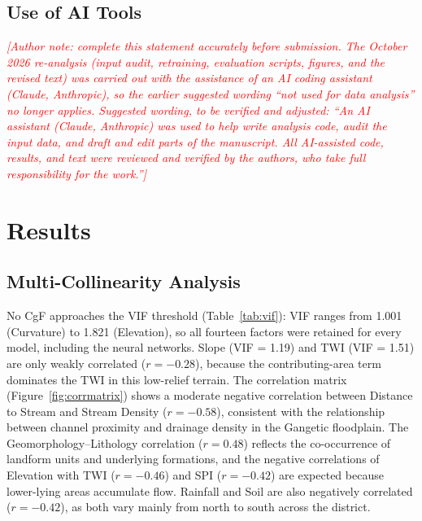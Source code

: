 \documentclass[12pt, a4paper]{article}
\begin{document}
\subsection*{Use of AI Tools}
\textcolor{red}{\textit{[Author note: complete this statement accurately before submission. The October 2026 re-analysis (input audit, retraining, evaluation scripts, figures, and the revised text) was carried out with the assistance of an AI coding assistant (Claude, Anthropic), so the earlier suggested wording ``not used for data analysis'' no longer applies. Suggested wording, to be verified and adjusted: ``An AI assistant (Claude, Anthropic) was used to help write analysis code, audit the input data, and draft and edit parts of the manuscript. All AI-assisted code, results, and text were reviewed and verified by the authors, who take full responsibility for the work.'']}}

\section{Results}

\subsection{Multi-Collinearity Analysis}
\label{sec:res_vif}

No CgF approaches the VIF threshold (Table~\ref{tab:vif}): VIF ranges from 1.001 (Curvature) to 1.821 (Elevation), so all fourteen factors were retained for every model, including the neural networks. Slope (VIF = 1.19) and TWI (VIF = 1.51) are only weakly correlated ($r = -0.28$), because the contributing-area term dominates the TWI in this low-relief terrain. The correlation matrix (Figure~\ref{fig:corrmatrix}) shows a moderate negative correlation between Distance to Stream and Stream Density ($r = -0.58$), consistent with the relationship between channel proximity and drainage density in the Gangetic floodplain. The Geomorphology--Lithology correlation ($r = 0.48$) reflects the co-occurrence of landform units and underlying formations, and the negative correlations of Elevation with TWI ($r = -0.46$) and SPI ($r = -0.42$) are expected because lower-lying areas accumulate flow. Rainfall and Soil are also negatively correlated ($r = -0.42$), as both vary mainly from north to south across the district.
\end{document}
